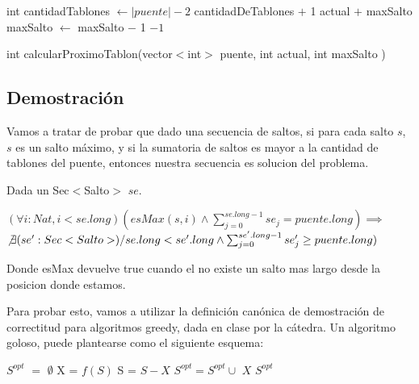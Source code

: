\begin{algorithm}[H]
\begin{algorithmic}[1]
\STATE int cantidadTablones $\gets |puente| - 2$
        \RETURN cantidadDeTablones $+$ 1
    \ENDIF
        \RETURN actual $+$ maxSalto
    \ENDIF
    \STATE maxSalto $\gets$ maxSalto $-$ 1
\ENDWHILE
\RETURN $-1$
\caption{int calcularProximoTablon(vector$<$int$>$ puente, int actual, int maxSalto )}%
\end{algorithmic}
\end{algorithm}
\subsection{Demostraci\'on}

Vamos a tratar de probar que dado una secuencia de saltos, si para cada salto $s$, $s$ es un salto m\'aximo, y si la sumatoria de saltos es mayor a la cantidad de tablones del puente, entonces nuestra secuencia es solucion del problema.

Dada un Sec$<$Salto$>$ $se$.

$(\forall i:Nat, i < se.long)(esMax(s,i) \wedge \sum_{j=0}^{se.long-1}se_{j} = puente.long)\implies$ \\ $\not\exists (se':Sec<Salto>) /
se.long < se'.long \wedge \sum_{j=0}^{se'.long-1}se'_{j} \geq puente.long)$  

Donde esMax devuelve true cuando el no existe un salto mas largo desde la posicion donde estamos.

Para probar esto, vamos a utilizar la definici\'on can\'onica de demostraci\'on de correctitud para algoritmos greedy, dada en clase por la c\'atedra. Un algoritmo goloso, puede plantearse como el siguiente esquema:

\begin{algorithm}
\begin{algorithmic}
\STATE $S^{opt}$ $=$ $\emptyset$
    \STATE X = $f(S)$
    \STATE S = $S - {X}$
    \STATE $S^{opt} = S^{opt} \cup$ ${X}$   
    \ENDIF         
\ENDWHILE
\RETURN $S^{opt}$
\end{algorithmic}
\end{algorithm}


